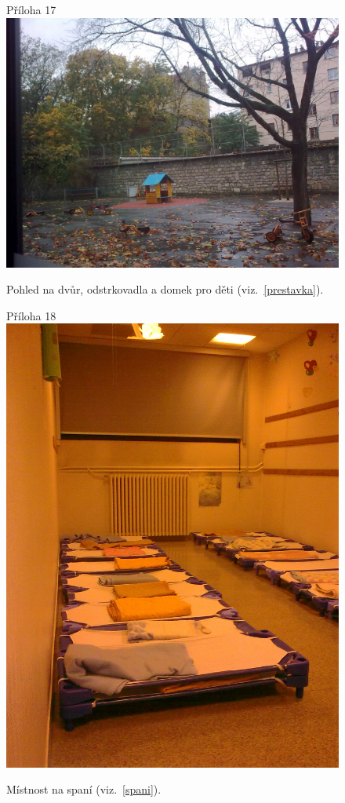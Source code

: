 	\begin{figure}[tb]
		\centering
		Příloha 17\\
		\includegraphics[height=0.35\textheight]{./fotky/Obr17.jpg}
		\caption{
			Pohled na dvůr, odstrkovadla a domek pro děti (viz.~\ref{prestavka}).
		}
		\label{Obr17}
	\end{figure}

	\begin{figure}[tb]
		\centering
		Příloha 18\\
		\includegraphics[height=0.35\textheight]{./fotky/Obr18.jpg}
		\caption{
			Místnost na spaní (viz.~\ref{spani}).
		}
		\label{Obr18}
	\end{figure}
	
